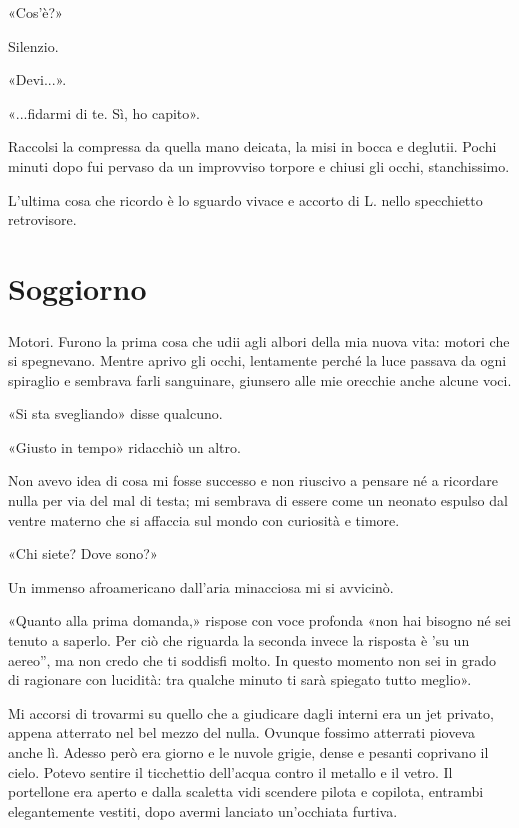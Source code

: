 \documentclass[a4paper,12pt]{book}
\begin{document}
«Cos'è?»

Silenzio.

«Devi...».

«...fidarmi di te. Sì, ho capito».

Raccolsi la compressa da quella mano deicata, la misi in bocca e deglutii. Pochi
minuti dopo fui pervaso da un improvviso torpore e chiusi gli occhi,
stanchissimo.

L'ultima cosa che ricordo è lo sguardo vivace e accorto di L. nello
specchietto retrovisore.

\chapter{Soggiorno}

\paragraph{}
Motori. Furono la prima cosa che udii agli albori della mia nuova vita: motori
che si spegnevano. Mentre aprivo gli occhi, lentamente perché la luce passava
da ogni spiraglio e sembrava farli sanguinare, giunsero alle mie orecchie anche
alcune voci.

«Si sta svegliando» disse qualcuno.

«Giusto in tempo» ridacchiò un altro.

Non avevo idea di cosa mi fosse successo e non riuscivo a pensare né a
ricordare nulla per via del mal di testa; mi sembrava di essere come un neonato
espulso dal ventre materno che si affaccia sul mondo con curiosità e timore.

«Chi siete? Dove sono?»

Un immenso afroamericano dall'aria minacciosa mi si avvicinò.

«Quanto alla prima domanda,» rispose con voce profonda «non hai bisogno né
sei tenuto a saperlo. Per ciò che riguarda la seconda invece la risposta è
'su un aereo'', ma non credo che ti soddisfi molto. In questo momento non sei
in grado di ragionare con lucidità: tra qualche minuto ti sarà spiegato tutto
meglio».

Mi accorsi di trovarmi su quello che a giudicare dagli interni era un jet
privato, appena atterrato nel bel mezzo del nulla. Ovunque fossimo atterrati
pioveva anche lì. Adesso però era giorno e le nuvole grigie, dense e pesanti
coprivano il cielo. Potevo sentire il ticchettio dell'acqua contro il metallo
e il vetro. Il portellone era aperto e dalla scaletta vidi scendere pilota e
copilota, entrambi elegantemente vestiti, dopo avermi lanciato un'occhiata
furtiva.
\end{document}
